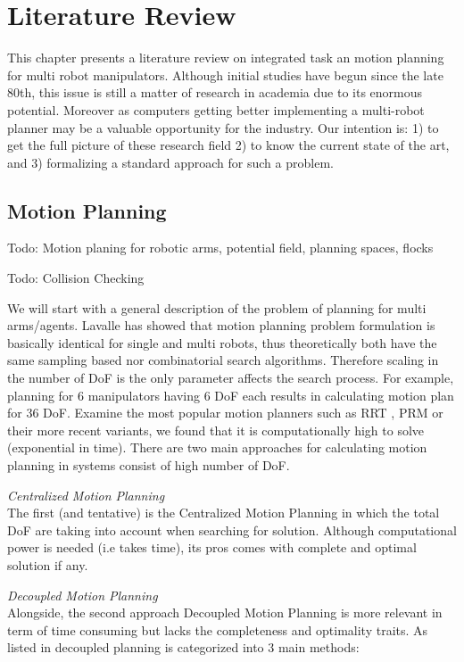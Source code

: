 

\section{Literature Review}

This chapter presents a literature review on integrated task an motion planning for multi robot manipulators. Although initial studies have begun since the late 80th, this issue is still a matter of research in academia due to its enormous potential. Moreover as computers getting better implementing a multi-robot planner may be a valuable opportunity for the industry. Our intention is: 1) to get the full picture of these research field 2) to know the current state of the art, and 3) formalizing a standard approach for such a problem.


\subsection{Motion Planning}
\label{section:motion_planning}

Todo: Motion planing for robotic arms, potential field, planning spaces, flocks

Todo: Collision Checking

We will start with a general description of the problem of planning for multi arms/agents. Lavalle \cite{lavalle2006planning} 
has showed that motion planning problem formulation  is basically identical for single and multi robots, thus theoretically both have the same sampling based nor combinatorial search algorithms. Therefore scaling in the number of DoF is the only parameter affects the search process. For example, planning for 6 manipulators having 6 DoF each results in calculating motion plan for 36 DoF. Examine the most popular motion planners such as RRT \cite{lavalle1998rapidly}, PRM \cite{kavraki1996probabilistic} 
or their more recent variants, we found that it is computationally high to solve (exponential in time). There are two main approaches for calculating motion planning in systems consist of high number of DoF. 


\textit{Centralized Motion Planning} \\
The first (and tentative) is the Centralized Motion Planning in which the total DoF are taking into account when searching for solution. Although computational power is needed (i.e takes time), its pros comes with complete and optimal solution if any.

\textit{Decoupled Motion Planning} \\
Alongside, the second approach Decoupled Motion Planning is more relevant in term of time consuming but lacks the completeness and optimality traits. As listed in \cite{smith2012dual,lavalle2006planning} decoupled planning is categorized into 3 main methods:
	


